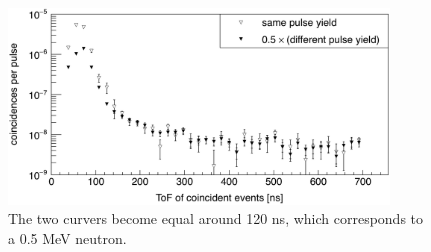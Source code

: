 \begin{figure}[]
\centering
    \includegraphics[width=0.9\textwidth]{Content/Methods/NoiseSubtraction.png}
    \caption{The two curvers become equal around 120 ns, which corresponds to a 0.5 MeV neutron. }
\end{figure}